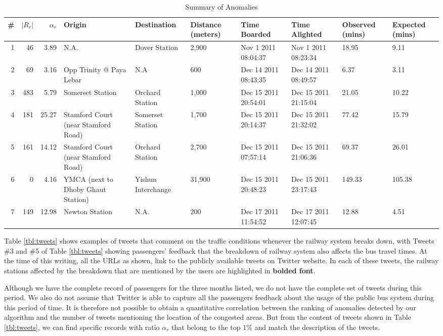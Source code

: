 \documentclass[conference]{IEEEtran.1.8}
\begin{document}
\begin{table}[htb]
	\centering
	\caption{Summary of Anomalies}
	\label{tbl:anomalies}
	\begin{tabular}{|r|r|r|p{2.3cm}|p{2.3cm}|p{1.2cm}|p{1.6cm}|p{1.6cm}|p{1.4cm}|p{1.4cm}|}
		\hline
		\# & $|R_r|$ & $\alpha_r$ & Origin & Destination & Distance (meters) & Time Boarded & Time Alighted & Observed (mins) & Expected (mins) \\
		\hline
		1 & 46 & 3.89 & N.A. & Dover Station & 2,900 & Nov 1 2011 08:04:37 & Nov 1 2011 08:23:34 & 18.95 & 9.11 \\
		\hline
		2 & 69 & 3.16 & Opp Trinity @ Paya Lebar & N.A & 600 & Dec 14 2011 08:43:35 & Dec 14 2011 08:49:57 &6.37 & 3.11\\
		\hline
		3 & 483 & 5.79 & Somerset Station & Orchard Station & 1,000 & Dec 15 2011 20:54:01 & Dec 15 2011 21:15:04 & 21.05 & 10.22 \\
		\hline
		4 & 181 & 25.27 & Stamford Court (near Stamford Road) & Somerset Station & 1,700 & Dec 15 2011 20:14:37 & Dec 15 2011 21:32:02 & 77.42 & 15.79 \\
		\hline
		5 & 161 & 14.12 & Stamford Court (near Stamford Road) & Orchard Station & 2,700 & Dec 15 2011 07:57:14 & Dec 15 2011 21:06:36 & 69.37 & 26.01 \\
		\hline
		6 & 0 & 4.16 & YMCA (next to Dhoby Ghaut Station) & Yishun Interchange & 31,900 & Dec 15 2011 20:48:23 & Dec 15 2011 23:17:43 & 149.33 & 105.38 \\
		\hline
		7 & 149 & 12.98 & Newton Station & N.A. & 200 & Dec 17 2011 11:54:52 & Dec 17 2011 12:07:45 & 12.88 & 4.51 \\
		\hline
	\end{tabular}
\end{table}

Table \ref{tbl:tweets} shows examples of tweets that comment on the traffic conditions whenever the railway system breaks down, with Tweets \#3 and \#5 of Table \ref{tbl:tweets} showing passengers' feedback that the breakdown of railway system also affects the bus travel times. At the time of this writing, all the URLs as shown, link to the publicly available tweets on Twitter website. In each of these tweets, the railway stations affected by the breakdown that are mentioned by the users are highlighted in \textbf{bolded font}.

Although we have the complete record of passengers for the three months listed, we do not have the complete set of tweets during this period. We also do not assume that Twitter is able to capture all the passengers feedback about the usage of the public bus system during this period of time. It is therefore not possible to obtain a quantitative correlation between the ranking of anomalies detected by our algorithm and the number of tweets mentioning the location of the congested areas. But from the content of tweets shown in Table \ref{tbl:tweets}, we can find specific records with ratio $\alpha_r$ that belong to the top 1\% and match the description of the tweets.
\end{document}
